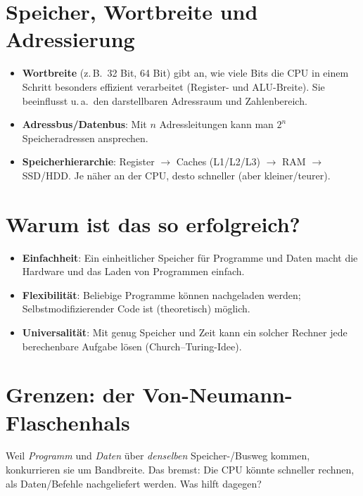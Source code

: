 \documentclass[../skript/main.tex]{subfiles}
\begin{document}
\section{Speicher, Wortbreite und Adressierung}
\begin{itemize}
	\item \textbf{Wortbreite} (z.\,B.\ 32 Bit, 64 Bit) gibt an, wie viele Bits die CPU in einem Schritt besonders effizient verarbeitet
	(Register- und ALU-Breite). Sie beeinflusst u.\,a.\ den darstellbaren Adressraum und Zahlenbereich.
	\item \textbf{Adressbus/Datenbus}: Mit \(n\) Adressleitungen kann man \(2^n\) Speicheradressen ansprechen.
	\item \textbf{Speicherhierarchie}: Register \(\rightarrow\) Caches (L1/L2/L3) \(\rightarrow\) RAM \(\rightarrow\) SSD/HDD.
	Je näher an der CPU, desto schneller (aber kleiner/teurer).
\end{itemize}

\section{Warum ist das so erfolgreich?}
\begin{itemize}
	\item \textbf{Einfachheit}: Ein einheitlicher Speicher für Programme und Daten macht die Hardware und das Laden von Programmen einfach.
	\item \textbf{Flexibilität}: Beliebige Programme können nachgeladen werden; Selbstmodifizierender Code ist (theoretisch) möglich.
	\item \textbf{Universalität}: Mit genug Speicher und Zeit kann ein solcher Rechner jede berechenbare Aufgabe lösen (Church–Turing-Idee).
\end{itemize}

\section{Grenzen: der Von-Neumann-Flaschenhals}
Weil \emph{Programm} und \emph{Daten} über \emph{denselben} Speicher-/Busweg kommen, konkurrieren sie um Bandbreite.
Das bremst: Die CPU könnte schneller rechnen, als Daten/Befehle nachgeliefert werden. Was hilft dagegen?
\end{document}
